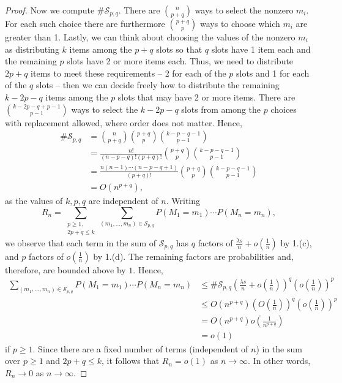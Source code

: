 \documentclass{homework}
\begin{document}
\begin{proof}
		Now we compute $\#\mathcal{S}_{p,q}$. There are $\binom{n}{p+q}$ ways to select the nonzero $m_i$. For each such choice there are furthermore $\binom{p+q}{p}$ ways to choose which $m_i$ are greater than 1. Lastly, we can think about choosing the values of the nonzero $m_i$ as distributing $k$ items among the $p+q$ slots so that $q$ slots have 1 item each and the remaining $p$ slots have 2 or more items each. Thus, we need to distribute $2p+q$ items to meet these requirements -- 2 for each of the $p$ slots and 1 for each of the $q$ slots -- then we can decide freely how to distribute the remaining $k-2p-q$ items among the $p$ slots that may have 2 or more items. There are $\binom{k-2p-q+p-1}{p-1}$ ways to select the $k-2p-q$ slots from among the $p$ choices with replacement allowed, where order does not matter. Hence,
		\begin{align*}
			\#\mathcal{S}_{p,q} &= \binom{n}{p+q}\binom{p+q}{p}\binom{k-p-q-1}{p-1} \\[0.5em]
			&= \frac{n!}{(n-p-q)!(p+q)!}\binom{p+q}{p}\binom{k-p-q-1}{p-1} \\[0.5em]
			&= \frac{n(n-1)\cdots(n-p-q+1)}{(p+q)!}\binom{p+q}{p}\binom{k-p-q-1}{p-1}\\
			&= O(n^{p+q}),
		\end{align*}
		as the values of $k, p, q$ are independent of $n$. Writing
		\begin{equation*}
			R_n = \sum_{\substack{p \ge 1,\\ 2p+q\le k}}\sum_{(m_1,\dots, m_n)\in \mathcal{S}_{p,q}}P(M_1=m_1)\cdots P(M_n = m_n ),
		\end{equation*}
		we observe that each term in the sum of $\mathcal{S}_{p,q}$ has $q$ factors of $\frac{\lambda s}{n} + o\left(\frac{1}{n}\right)$ by 1.(c), and $p$ factors of $o\left(\frac{1}{n}\right)$ by 1.(d). The remaining factors are probabilities and, therefore, are bounded above by $1$. Hence,
		\begin{align*}
			\sum_{(m_1, \dots, m_n) \in \mathcal{S}_{p,q}}P(M_1 = m_1) \cdots P(M_n = m_n) &\le \#\mathcal{S}_{p,q}\left(\frac{\lambda s}{n} + o\left(\frac{1}{n}\right)\right)^q\left(o\left(\frac{1}{n}\right)\right)^p  \\
			&\le O\left(n^{p+q}\right) \left(O\left(\frac{1}{n}\right)\right)^q\left(o\left(\frac{1}{n}\right)\right)^p \\
			&=  O\left(n^{p+q}\right)o\left(\frac{1}{n^{p+q}}\right) \\
			&= o(1)
		\end{align*}
		if $p \ge 1$. Since there are a fixed number of terms (independent of $n$) in the sum over $p \ge1$ and $2p+q \le k$, it follows that $R_n = o(1)$ as $n \to \infty$. In other words, $R_n \to 0$ as $n \to \infty$.
		

\end{proof}
\end{document}
